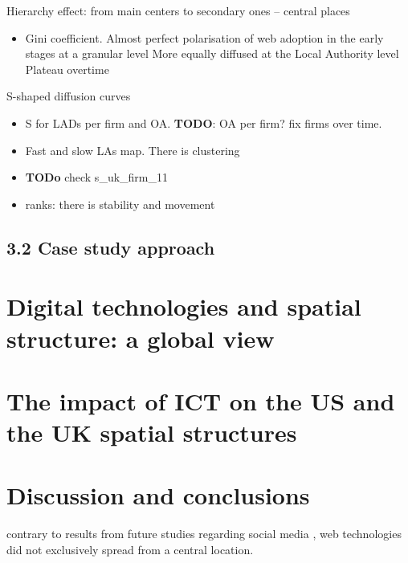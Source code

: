 \documentclass[
  authoryear,
  preprint,
  3p]{elsarticle}
\providecommand{\tightlist}{%
  \setlength{\itemsep}{0pt}\setlength{\parskip}{0pt}}\usepackage{longtable,booktabs,array}
\begin{document}
Hierarchy effect: from main centers to secondary ones -- central places

\begin{itemize}
\tightlist
\item
  Gini coefficient. Almost perfect polarisation of web adoption in the
  early stages at a granular level More equally diffused at the Local
  Authority level Plateau overtime
\end{itemize}

S-shaped diffusion curves

\begin{itemize}
\item
  S for LADs per firm and OA. \textbf{TODO}: OA per firm? fix firms over
  time.
\item
  Fast and slow LAs map. There is clustering
\item
  \textbf{TODo} check s\_uk\_firm\_11
\item
  ranks: there is stability and movement
\end{itemize}

\hypertarget{sec3.2}{%
\subsection{3.2 Case study approach}\label{sec3.2}}

\hypertarget{sec4}{%
\section{Digital technologies and spatial structure: a global
view}\label{sec4}}

\hypertarget{sec5}{%
\section{The impact of ICT on the US and the UK spatial
structures}\label{sec5}}

\hypertarget{sec6}{%
\section{Discussion and conclusions}\label{sec6}}

contrary to results from future studies regarding social media
\citep{lengyel2020role}, web technologies did not exclusively spread
from a central location.


\renewcommand\refname{References}
  
\end{document}
